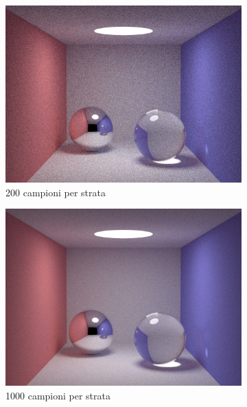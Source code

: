 \begin{figure}[tb]
\begin{subfigure}[c]{0.4\linewidth}
	\includegraphics[width=\linewidth]{../assets/appendixD_result_200.png}
	\caption{200 campioni per strata}
    \end{subfigure}\hfill
    \begin{subfigure}[c]{0.4\linewidth}
	\centering
	\includegraphics[width=\linewidth]{../assets/appendixD_result_1000.png}
	\caption{1000 campioni per strata}
    \end{subfigure}\hfill
    \begin{subfigure}[c]{0.4\linewidth}
	\centering

\end{subfigure}
\end{figure}
